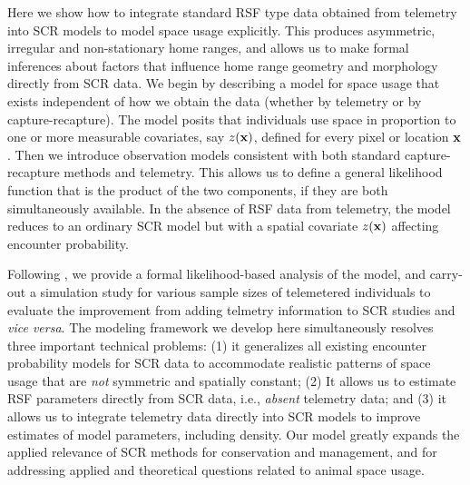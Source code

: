 Here we show how to integrate standard RSF type data obtained from
telemetry into SCR models to model space usage explicitly.  This
produces asymmetric, irregular and non-stationary home ranges, and
allows us to make formal inferences about factors that influence home
range geometry and morphology directly from SCR data.  We begin by
describing a model for space usage that exists independent of how we
obtain the data (whether by telemetry or by capture-recapture). The
model posits that individuals use space in proportion to one or more
measurable covariates, say $z({\bf x})$, defined for every pixel or
location ${\bf x}$.  Then we introduce observation models consistent
with both standard capture-recapture methods and telemetry.  This
allows us to define a general likelihood function that is the product
of the two components, if they are both simultaneously available.  In
the absence of RSF data from telemetry, the model reduces to an
ordinary SCR model but with a spatial covariate $z({\bf x})$ affecting
encounter probability.

Following \citet{borchers_efford:2008}, we provide a formal
likelihood-based analysis of the model, and carry-out a simulation
study for various sample sizes of telemetered individuals to evaluate
the improvement from adding telmetry information to SCR studies and
{\it vice versa}.
The modeling framework we develop here simultaneously resolves
 three important
technical problems: (1) it generalizes all existing
encounter probability models for SCR data to accommodate realistic
patterns of space usage that are {\it not} symmetric and spatially
constant;
(2) It allows us to estimate RSF
parameters directly from SCR data, i.e., {\it absent} telemetry data;
and (3) it allows us to integrate telemetry data directly into SCR
models to improve estimates of model parameters, including density.
Our model greatly expands the applied relevance of SCR methods for
conservation and management, and for addressing applied and theoretical
questions related to animal space usage.


